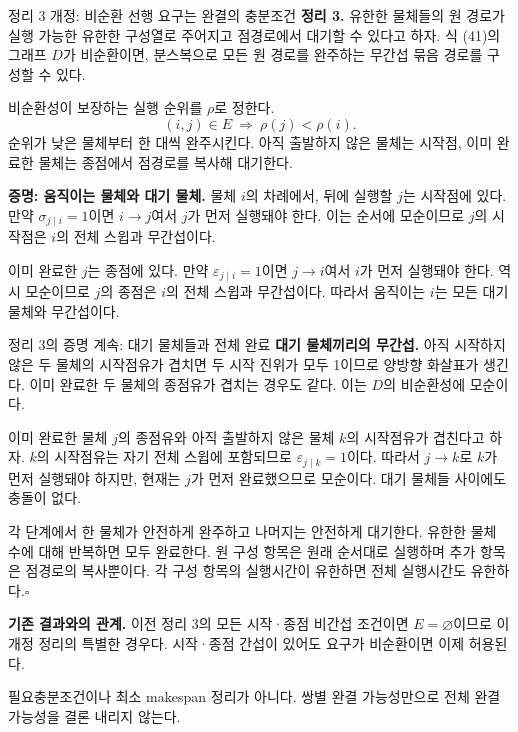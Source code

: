 \begin{frame}{정리 3 개정: 비순환 선행 요구는 완결의 충분조건}
\small
\textbf{정리 3.} 유한한 물체들의 원 경로가 실행 가능한 유한한 구성열로 주어지고
점경로에서 대기할 수 있다고 하자. 식 (41)의 그래프 $D$가 비순환이면,
분스복으로 모든 원 경로를 완주하는 무간섭 묶음 경로를 구성할 수 있다.
\par\medskip
비순환성이 보장하는 실행 순위를 $\rho$로 정한다.
\begin{equation}
 (i,j)\in E\ \Longrightarrow\ \rho(j)<\rho(i).
 \tag{42}
\end{equation}
순위가 낮은 물체부터 한 대씩 완주시킨다.
아직 출발하지 않은 물체는 시작점, 이미 완료한 물체는 종점에서 점경로를 복사해 대기한다.
\par\medskip
\textbf{증명: 움직이는 물체와 대기 물체.}
물체 $i$의 차례에서, 뒤에 실행할 $j$는 시작점에 있다.
만약 $\sigma_{j\mid i}=1$이면 $i\to j$여서 $j$가 먼저 실행돼야 한다.
이는 순서에 모순이므로 $j$의 시작점은 $i$의 전체 스윕과 무간섭이다.
\par\medskip
이미 완료한 $j$는 종점에 있다. 만약 $\varepsilon_{j\mid i}=1$이면 $j\to i$여서
$i$가 먼저 실행돼야 한다. 역시 모순이므로 $j$의 종점은 $i$의 전체 스윕과 무간섭이다.
따라서 움직이는 $i$는 모든 대기 물체와 무간섭이다.
\end{frame}

\begin{frame}{정리 3의 증명 계속: 대기 물체들과 전체 완료}
\small
\textbf{대기 물체끼리의 무간섭.}
아직 시작하지 않은 두 물체의 시작점유가 겹치면 두 시작 진위가 모두 1이므로
양방향 화살표가 생긴다. 이미 완료한 두 물체의 종점유가 겹치는 경우도 같다.
이는 $D$의 비순환성에 모순이다.
\par\medskip
이미 완료한 물체 $j$의 종점유와 아직 출발하지 않은 물체 $k$의 시작점유가 겹친다고 하자.
$k$의 시작점유는 자기 전체 스윕에 포함되므로 $\varepsilon_{j\mid k}=1$이다.
따라서 $j\to k$로 $k$가 먼저 실행돼야 하지만, 현재는 $j$가 먼저 완료했으므로 모순이다.
대기 물체들 사이에도 충돌이 없다.
\par\medskip
각 단계에서 한 물체가 안전하게 완주하고 나머지는 안전하게 대기한다.
유한한 물체 수에 대해 반복하면 모두 완료한다.
원 구성 항목은 원래 순서대로 실행하며 추가 항목은 점경로의 복사뿐이다.
각 구성 항목의 실행시간이 유한하면 전체 실행시간도 유한하다.\hfill$\square$
\par\medskip
\textbf{기존 결과와의 관계.} 이전 정리 3의 모든 시작·종점 비간섭 조건이면
$E=\varnothing$이므로 이 개정 정리의 특별한 경우다.
시작·종점 간섭이 있어도 요구가 비순환이면 이제 허용된다.
\par\smallskip\footnotesize
필요충분조건이나 최소 makespan 정리가 아니다.
쌍별 완결 가능성만으로 전체 완결 가능성을 결론 내리지 않는다.
\end{frame}

